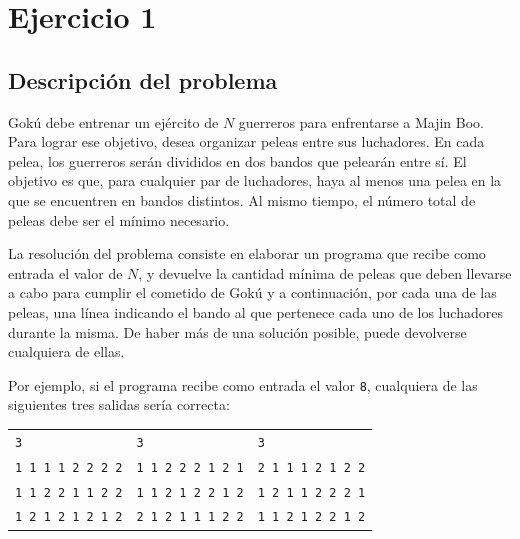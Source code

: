 \section{Ejercicio 1}
    \subsection{Descripción del problema}
        Gokú debe entrenar un ejército de $N$ guerreros para enfrentarse a Majin Boo. Para lograr ese objetivo, desea organizar peleas entre sus luchadores. En cada pelea, los guerreros serán divididos en dos bandos que pelearán entre sí. El objetivo es que, para cualquier par de luchadores, haya al menos una pelea en la que se encuentren en bandos distintos. Al mismo tiempo, el número total de peleas debe ser el mínimo necesario.

        La resolución del problema consiste en elaborar un programa que recibe como entrada el valor de $N$, y devuelve la cantidad mínima de peleas que deben llevarse a cabo para cumplir el cometido de Gokú y a continuación, por cada una de las peleas, una línea indicando el bando al que pertenece cada uno de los luchadores durante la misma. De haber más de una solución posible, puede devolverse cualquiera de ellas.

        Por ejemplo, si el programa recibe como entrada el valor \texttt{8}, cualquiera de las siguientes tres salidas sería correcta:

        \begin{center}\begin{tabular}{l @{\hskip 2em} | @{\hskip 2em} l @{\hskip 2em} | @{\hskip 2em} l}
            \texttt{3}               & \texttt{3}  &              \texttt{3}               \\
            \texttt{1 1 1 1 2 2 2 2} & \texttt{1 1 2 2 2 1 2 1} & \texttt{2 1 1 1 2 1 2 2} \\
            \texttt{1 1 2 2 1 1 2 2} & \texttt{1 1 2 1 2 2 1 2} & \texttt{1 2 1 1 2 2 2 1} \\
            \texttt{1 2 1 2 1 2 1 2} & \texttt{2 1 2 1 1 1 2 2} & \texttt{1 1 2 1 2 2 1 2} \\
        \end{tabular}\end{center}

